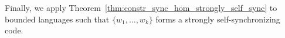 \begin{comment}
% 
In general, regular languages are closed under homomorphic mappings,
but an exponential blow-ups might occur~\cite{projections paper}.
However, such a blow-up does not occur for mappings whose images
are strongly self-synchronizing codes.

\begin{proposition}
 Let $\varphi : \Sigma^* \to \Gamma^*$
 be a homomorphism such that $\varphi(\Sigma)$
 is a strongly self-synchronizing code and $\mathcal A = (\Sigma, Q, \delta, q_0, F)$
 be a PDFA.
 Then, we can construct in polynomial time
 a PDFA $\mathcal A' = (\Gamma, Q', \delta', q_0', F')$
 such that $\varphi(L) = L(\mathcal A')$.
\end{proposition}
\begin{proof}

 Todo, insbesondere präfixcode, teile dazwischen undefiniert lassen
 aber kann von teilen dazwische zu final laufen?
 dann aber suffix oder so, zeigen, dass hier nicht sein kann.
 
 
 Oder, ohne automaten? aber darstellunge mit j,p's muss auch berechnet werden...
 
 
 Mit $C^*$ schneiden und nutzen, dass suffix code?
\end{proof}
\end{comment}

Finally, we apply Theorem~\ref{thm:constr_sync_hom_strongly_self_sync} to bounded languages
such that $\{ w_1, \ldots, w_k\}$ forms a strongly self-synchronizing code.

